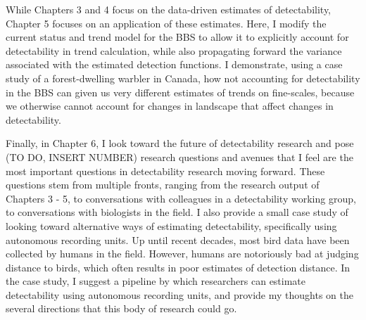 \par While Chapters 3 and 4 focus on the data-driven estimates of detectability, Chapter 5 focuses on an application of these estimates.
Here, I modify the current status and trend model for the BBS \citep{smith_spatially_2023} to allow it to explicitly account for detectability in trend calculation, while also propagating forward the variance associated with the estimated detection functions.
I demonstrate, using a case study of a forest-dwelling warbler in Canada, how not accounting for detectability in the BBS can given us very different estimates of trends on fine-scales, because we otherwise cannot account for changes in landscape that affect changes in detectability.

\par Finally, in Chapter 6, I look toward the future of detectability research and pose (TO DO, INSERT NUMBER) research questions and avenues that I feel are the most important questions in detectability research moving forward.
These questions stem from multiple fronts, ranging from the research output of Chapters 3 - 5, to conversations with colleagues in a detectability working group, to conversations with biologists in the field.
I also provide a small case study of looking toward alternative ways of estimating detectability, specifically using autonomous recording units.
Up until recent decades, most bird data have been collected by humans in the field.
However, humans are notoriously bad at judging distance to birds, which often results in poor estimates of detection distance.
In the case study, I suggest a pipeline by which researchers can estimate detectability using autonomous recording units, and provide my thoughts on the several directions that this body of research could go.

